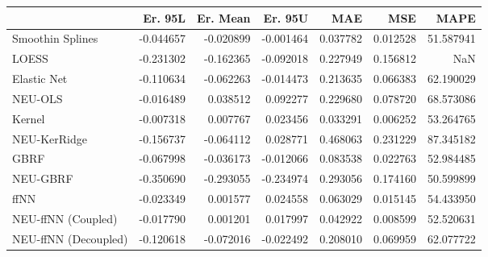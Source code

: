 \begin{tabular}{lrrrrrr}
\toprule
{} &   Er. 95L &  Er. Mean &   Er. 95U &       MAE &       MSE &       MAPE \\
\midrule
Smoothin Splines     & -0.044657 & -0.020899 & -0.001464 &  0.037782 &  0.012528 &  51.587941 \\
LOESS                & -0.231302 & -0.162365 & -0.092018 &  0.227949 &  0.156812 &        NaN \\
Elastic Net          & -0.110634 & -0.062263 & -0.014473 &  0.213635 &  0.066383 &  62.190029 \\
NEU-OLS              & -0.016489 &  0.038512 &  0.092277 &  0.229680 &  0.078720 &  68.573086 \\
Kernel               & -0.007318 &  0.007767 &  0.023456 &  0.033291 &  0.006252 &  53.264765 \\
NEU-KerRidge         & -0.156737 & -0.064112 &  0.028771 &  0.468063 &  0.231229 &  87.345182 \\
GBRF                 & -0.067998 & -0.036173 & -0.012066 &  0.083538 &  0.022763 &  52.984485 \\
NEU-GBRF             & -0.350690 & -0.293055 & -0.234974 &  0.293056 &  0.174160 &  50.599899 \\
ffNN                 & -0.023349 &  0.001577 &  0.024558 &  0.063029 &  0.015145 &  54.433950 \\
NEU-ffNN (Coupled)   & -0.017790 &  0.001201 &  0.017997 &  0.042922 &  0.008599 &  52.520631 \\
NEU-ffNN (Decoupled) & -0.120618 & -0.072016 & -0.022492 &  0.208010 &  0.069959 &  62.077722 \\
\bottomrule
\end{tabular}
